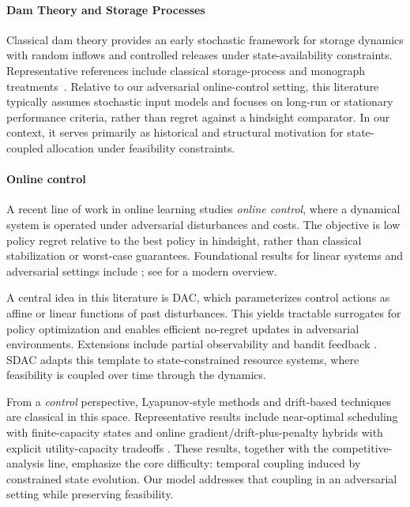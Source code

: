 \documentclass[11pt]{article}
\begin{document}
\paragraph{Dam Theory and Storage Processes}
Classical dam theory provides an early stochastic framework for storage dynamics with random inflows and controlled releases under state-availability constraints. Representative references include classical storage-process and monograph treatments~\cite{moran1954dams,prabhu1998stochastic}. Relative to our adversarial online-control setting, this literature typically assumes stochastic input models and focuses on long-run or stationary performance criteria, rather than regret against a hindsight comparator. In our context, it serves primarily as historical and structural motivation for state-coupled allocation under feasibility constraints.


\paragraph{Online control}

A recent line of work in online learning studies \emph{online control}, where a dynamical system is operated under adversarial disturbances and costs. The objective is low policy regret relative to the best policy in hindsight, rather than classical stabilization or worst-case guarantees. Foundational results for linear systems and adversarial settings include \cite{agarwal2019online, agarwal2019logarithmic, hazan2020nonstochasticBandit, simchowitz2020improper}; see \cite{hazan_introduction_2025} for a modern overview.

A central idea in this literature is DAC, which parameterizes control actions as affine or linear functions of past disturbances. This yields tractable surrogates for policy optimization and enables efficient no-regret updates in adversarial environments. Extensions include partial observability \cite{lale2020logarithmic} and bandit feedback \cite{hazan2020nonstochasticBandit}. SDAC adapts this template to state-constrained resource systems, where feasibility is coupled over time through the dynamics.


From a \emph{control} perspective, Lyapunov-style methods and drift-based techniques are classical in this space. Representative results include near-optimal scheduling with finite-capacity states \cite{Huang2013} and online gradient/drift-plus-penalty hybrids with explicit utility-capacity tradeoffs \cite{Yu2019}. These results, together with the competitive-analysis line, emphasize the core difficulty: temporal coupling induced by constrained state evolution. Our model addresses that coupling in an adversarial setting while preserving feasibility.
\end{document}

